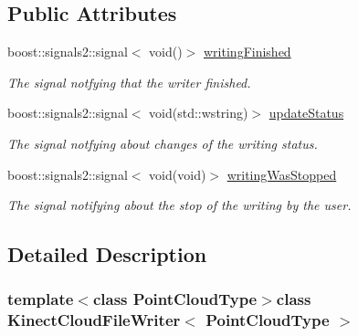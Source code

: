 \subsection*{Public Attributes}
\begin{DoxyCompactItemize}
\item 
\hypertarget{class_kinect_cloud_file_writer_af9ac0f04741dd59c723a3c253cc732c9}{}boost\+::signals2\+::signal$<$ void()$>$ \hyperlink{class_kinect_cloud_file_writer_af9ac0f04741dd59c723a3c253cc732c9}{writing\+Finished}\label{class_kinect_cloud_file_writer_af9ac0f04741dd59c723a3c253cc732c9}

\begin{DoxyCompactList}\small\item\em The signal notfying that the writer finished. \end{DoxyCompactList}\item 
\hypertarget{class_kinect_cloud_file_writer_a0529ebd3acf2d41aa3967c6d320b7120}{}boost\+::signals2\+::signal$<$ void(std\+::wstring)$>$ \hyperlink{class_kinect_cloud_file_writer_a0529ebd3acf2d41aa3967c6d320b7120}{update\+Status}\label{class_kinect_cloud_file_writer_a0529ebd3acf2d41aa3967c6d320b7120}

\begin{DoxyCompactList}\small\item\em The signal notfying about changes of the writing status. \end{DoxyCompactList}\item 
\hypertarget{class_kinect_cloud_file_writer_aa04ac751f2d02a6b81f3e5f194c03c09}{}boost\+::signals2\+::signal$<$ void(void)$>$ \hyperlink{class_kinect_cloud_file_writer_aa04ac751f2d02a6b81f3e5f194c03c09}{writing\+Was\+Stopped}\label{class_kinect_cloud_file_writer_aa04ac751f2d02a6b81f3e5f194c03c09}

\begin{DoxyCompactList}\small\item\em The signal notifying about the stop of the writing by the user. \end{DoxyCompactList}\end{DoxyCompactItemize}


\subsection{Detailed Description}
\subsubsection*{template$<$class Point\+Cloud\+Type$>$class Kinect\+Cloud\+File\+Writer$<$ Point\+Cloud\+Type $>$}

